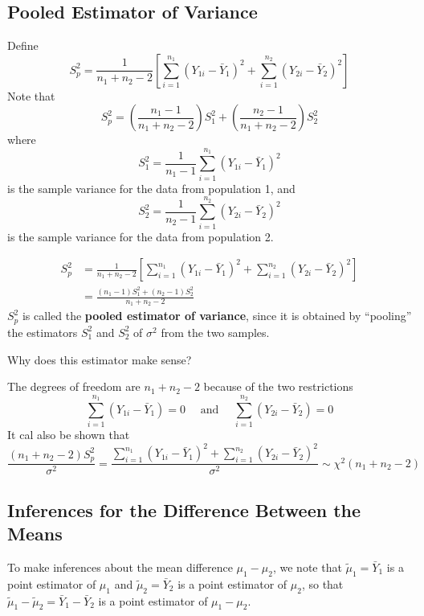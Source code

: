 \subsection{Pooled Estimator of Variance}
Define
\[S_{p}^{2}=\frac{1}{n_{1}+n_{2}-2}\left[\sum_{i=1}^{n_{1}}\left(Y_{1 i}-\bar{Y}_{1}\right)^{2}+\sum_{i=1}^{n_{2}}\left(Y_{2 i}-\bar{Y}_{2}\right)^{2}\right]\]
Note that
\[S_{p}^{2}=\left(\frac{n_{1}-1}{n_{1}+n_{2}-2}\right) S_{1}^{2}+\left(\frac{n_{2}-1}{n_{1}+n_{2}-2}\right) S_{2}^{2}\]
where
\[S_{1}^{2}=\frac{1}{n_{1}-1} \sum_{i=1}^{n_{1}}\left(Y_{1 i}-\bar{Y}_{1}\right)^{2}\]
is the sample variance for the data from population 1, and
\[S_{2}^{2}=\frac{1}{n_{2}-1} \sum_{i=1}^{n_{2}}\left(Y_{2 i}-\bar{Y}_{2}\right)^{2}\]
is the sample variance for the data from population 2.
\begin{defbox}
    \begin{definition}
        \[\begin{aligned}
                S_{p}^{2} & =\frac{1}{n_{1}+n_{2}-2}\left[\sum_{i=1}^{n_{1}}\left(Y_{1 i}-\bar{Y}_{1}\right)^{2}+\sum_{i=1}^{n_{2}}\left(Y_{2 i}-\bar{Y}_{2}\right)^{2}\right] \\
                          & =\frac{\left(n_{1}-1\right) S_{1}^{2}+\left(n_{2}-1\right) S_{2}^{2}}{n_{1}+n_{2}-2}
            \end{aligned}\]
        $ S_p^2 $ is called the \textbf{pooled estimator of variance}, since it is obtained by
        ``pooling'' the estimators $ S_1^2 $ and $ S_2^2 $ of $ \sigma^2 $ from the two samples.
    \end{definition}
\end{defbox}
Why does this estimator make sense?

The degrees of freedom are $ n_1+n_2-2 $ because of the two restrictions
\[\sum_{i=1}^{n_{1}}\left(Y_{1 i}-\bar{Y}_{1}\right)=0 \quad \text { and } \quad \sum_{i=1}^{n_{2}}\left(Y_{2 i}-\bar{Y}_{2}\right)=0\]
It cal also be shown that
\[\frac{\left(n_{1}+n_{2}-2\right) S_{p}^{2}}{\sigma^{2}}=\frac{\sum_{i=1}^{n_{1}}\left(Y_{1 i}-\bar{Y}_{1}\right)^{2}+\sum_{i=1}^{n_{2}}
    \left(Y_{2 i}-\bar{Y}_{2}\right)^{2}}{\sigma^{2}} \sim \chi^{2}\left(n_{1}+n_{2}-2\right)\]


\subsection{Inferences for the Difference Between the Means}
To make inferences about the mean difference $ \mu_1-\mu_2 $,
we note that $ \tilde{\mu}_1=\bar{Y}_1 $ is a point estimator of $ \mu_1 $ and
$ \tilde{\mu}_2=\bar{Y}_2 $ is a point estimator of $ \mu_2 $, so that $ \tilde{\mu}_1-
    \tilde{\mu}_2=\bar{Y}_1-\bar{Y}_2 $ is a point estimator of $ \mu_1-\mu_2 $.

